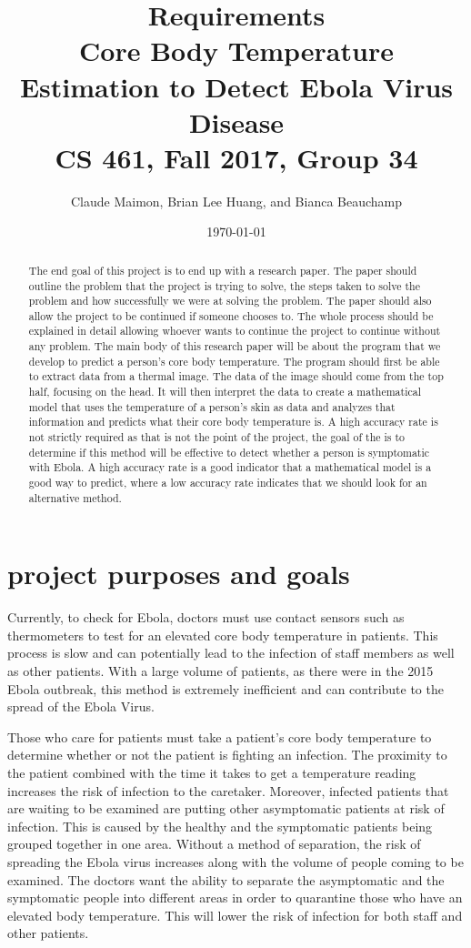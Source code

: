 \documentclass[onecolumn, draftclsnofoot,10pt, compsoc]{IEEEtran}
\title{%
  Requirements \\
  \vspace{0.4cm}
  \large Core Body Temperature Estimation to Detect Ebola Virus Disease \\
  \vspace{0.4cm}
  \large CS 461, Fall 2017, Group 34\\
    }
\author{Claude Maimon, Brian Lee Huang, and Bianca Beauchamp}
\date{\today}
\begin{document}
\maketitle

\begin{abstract}
	The end goal of this project is to end up with a research paper. The paper should outline the problem that the project is trying to solve, the steps taken to solve the problem and how successfully we were
	at solving the problem. The paper should also allow the project to be continued if someone chooses to. The whole process should be explained in detail allowing whoever wants to continue the
	project to continue without any problem. The main body of this research paper will be about the program that we develop to predict a person's core body temperature. The program should first be able to
	extract data from a thermal image. The data of the image should come from the top half, focusing on the head. It will then interpret the data to create a mathematical model that uses the temperature of a 
	person's skin as data and analyzes that information and predicts what their core body temperature is. A high accuracy rate is not strictly required as that is not the point of the project, 
	the goal of the is to determine if this method will be effective to detect whether a person is symptomatic with Ebola. A high accuracy rate is a good indicator that a mathematical model
	is a good way to predict, where a low accuracy rate indicates that we should look for an alternative method.
\end{abstract}

\newpage

\tableofcontents
\newpage
\section{project purposes and goals}
Currently, to check for Ebola, doctors must use contact sensors such as thermometers to test for an elevated core body temperature in patients. This process is slow and can potentially lead to the infection of staff members as well as other patients. With a large volume of patients, as there were in the 2015 Ebola outbreak, this method is extremely inefficient and can contribute to the spread of the Ebola Virus.

Those who care for patients must take a patient’s core body temperature to determine whether or not the patient is fighting an infection. The proximity to the patient combined with the time it takes to get a temperature reading increases the risk of infection to the caretaker. Moreover, infected patients that are waiting to be examined are putting other asymptomatic patients at risk of infection. This is caused by the healthy and the symptomatic patients being grouped together in one area. Without a method of separation, the risk of spreading the Ebola virus increases along with the volume of people coming to be examined. The doctors want the ability to separate the asymptomatic and the symptomatic people into different areas in order to quarantine those who have an elevated body temperature. This will lower the risk of infection for both staff and other patients.
\end{document}
